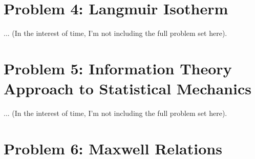 \section*{Problem 4: Langmuir Isotherm}
...
(In the interest of time, I'm not including the full problem set here). 

\section*{Problem 5: Information Theory Approach to Statistical Mechanics}
...
(In the interest of time, I'm not including the full problem set here). 

\section*{Problem 6: Maxwell Relations}


